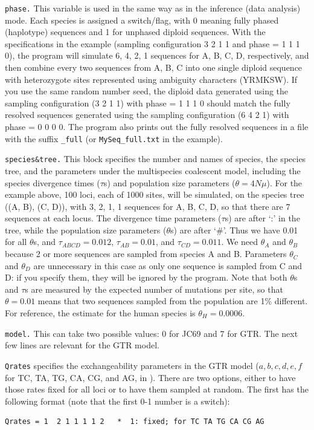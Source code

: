 \documentclass{book}
\numberwithin{equation}{section} \renewcommand{\baselinestretch}{0.55}
\begin{document}
\texttt{phase.}  This variable is used in the same way as in the
inference (data analysis) mode. Each species is assigned a
switch/flag, with 0 meaning fully phased (haplotype) sequences and 1
for unphased diploid sequences.  With the specifications in the
example (sampling configuration 3 2 1 1 and phase = 1 1 1 0), the
program will simulate 6, 4, 2, 1 sequences for A, B, C, D,
respectively, and then combine every two sequences from A, B, C into
one single diploid sequence with heterozygote sites represented using
ambiguity characters (YRMKSW).  If you use the same random number
seed, the diploid data generated using the sampling configuration (3 2
1 1) with phase = 1 1 1 0 should match the fully resolved sequences
generated using the sampling configuration (6 4 2 1) with phase = 0 0
0 0.  The program also prints out the fully resolved sequences in a
file with the suffix \texttt{\_full} (or \texttt{MySeq\_full.txt} in
the example).

\texttt{species\&tree.}  This block specifies the number and names of
species, the species tree, and the parameters under the multispecies
coalescent model, including the species divergence times ($\tau$s) and
population size parameters ($\theta = 4N\mu$).  For the example above,
100 loci, each of 1000 sites, will be simulated, on the species tree
((A, B), (C, D)), with 3, 2, 1, 1 sequences for A, B, C, D, so that
there are 7 sequences at each locus.  The divergence time parameters
($\tau$s) are after `:' in the tree, while the population size
parameters ($\theta$s) are after `\#'.  Thus we have 0.01 for all
$\theta$s, and $\tau_{ABCD} = 0.012$, $\tau_{AB} = 0.01$, and
$\tau_{CD} = 0.011$.  We need $\theta_A$ and $\theta_B$ because 2 or
more sequences are sampled from species A and B.  Parameters
$\theta_C$ and $\theta_D$ are unnecessary in this case as only one
sequence is sampled from C and D: if you specify them, they will be
ignored by the program.  Note that both $\theta$s and $\tau$s are
measured by the expected number of mutations per site, so that
$\theta = 0.01$ means that two sequences sampled from the population
are 1\% different.  For reference, the estimate for the human species
is $\theta_H = 0.0006$.

\texttt{model.} This can take two possible values: 0 for JC69 and 7
for GTR. The next few lines are relevant for the GTR model.

\texttt{Qrates} specifies the exchangeability parameters in the GTR
model ($a, b, c, d, e, f$ for TC, TA, TG, CA, CG, and AG, in
\citealt{Yang1994a}). There are two options, either to have those
rates fixed for all loci or to have them sampled at random.  The first
has the following format (note that the first 0-1 number is a switch):
\begin{verbatim}
Qrates = 1  2 1 1 1 1 2   *  1: fixed; for TC TA TG CA CG AG
\end{verbatim}
\end{document}
